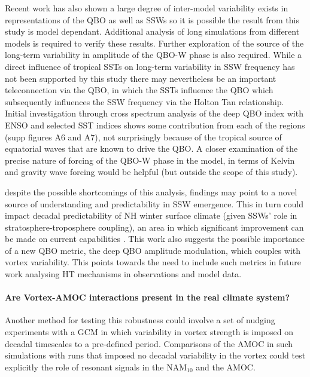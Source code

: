 Recent work has also shown a large degree of inter-model variability exists in representations of the QBO as well as SSWs \citep{Bushell2020,Ayarz2020} so it is possible the result from this study is model dependant. Additional analysis of long simulations from different models is required to verify these results. 
Further exploration of the source of the long-term variability in amplitude of the QBO-W phase is also required. While a direct influence of tropical SSTs on long-term variability in SSW frequency has not been supported by this study there may nevertheless be an important teleconnection via the QBO, in which the SSTs influence the QBO which subsequently influences the SSW frequency via the Holton Tan relationship. Initial investigation through cross spectrum analysis of the deep QBO index with ENSO and selected SST indices shows some contribution from each of the regions (supp figures A6 and A7), not surprisingly because of the tropical source of equatorial waves that are known to drive the QBO. A closer examination of the precise nature of forcing of the QBO-W phase in the model, in terms of Kelvin and gravity wave forcing would be helpful (but outside the scope of this study).

despite the possible shortcomings of this analysis, findings may point to a novel source of understanding and predictability in SSW emergence. This in turn could impact decadal predictability of NH winter surface climate (given SSWs' role in stratosphere-troposphere coupling), an area in which significant improvement can be made on current capabilities \citep{Zhang2019}. This work also suggests the possible importance of a new QBO metric, the deep QBO amplitude modulation, which couples with vortex variability. This points towards the need to include such metrics in future work analysing HT mechanisms in observations and model data.



\paragraph{Are Vortex-AMOC interactions present in the real climate system?} 

Another method for testing this robustness could involve a set of nudging experiments with a GCM in which variability in vortex strength is imposed on decadal timescales to a pre-defined period. Comparisons of the AMOC in such simulations with runs that imposed no decadal variability in the vortex could test explicitly the role of resonant signals in the NAM$_{10}$ and the AMOC. 
